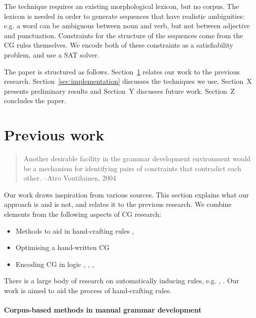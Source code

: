 The technique requires an existing morphological lexicon, but no corpus. 
The lexicon is needed in order to generate sequences that have realistic ambiguities: e.g. a word can be ambiguous between noun and verb, but not between adjective and punctuation. 
Constraints for the structure of the sequences come from the CG rules themselves.
We encode both of these constraints as a satisfiability problem, and use a SAT solver.

The paper is structured as follows. Section~\ref{sec:prev} relates our work to the previous research. Section~\ref{sec:implementation} discusses the techniques we use, Section~X presents preliminary results and  Section~Y discusses future work. Section~Z concludes the paper.






\section{Previous work}
\label{sec:prev}

\begin{quote}Another desirable facility in the grammar development environment would
be a mechanism for identifying pairs of constraints that contradict each
other.
--Atro Voutilainen, 2004
\end{quote}


Our work draws inspiration from various sources. This section explains what our approach is and is not, and relates it to the previous research. We combine elements from the following aspects of CG research:

\begin{itemize}
\item Methods to aid in hand-crafting rules \cite{voutilainen2004}, \cite{tyers_reynolds2015}
\item Optimising a hand-written CG \cite{bick2013tuning}
\item Encoding CG in logic \cite{lager98}, \cite{lager_nivre01}, \cite{lager01transformation}, \cite{listenmaa_claessen2015}
\end{itemize}

There is a large body of research on automatically inducing rules, e.g. \cite{inducing_cg1996}, \cite{lindberg_eineborg98ilp}%
. Our work is aimed to aid the process of hand-crafting rules.

\paragraph{Corpus-based methods in manual grammar development}

